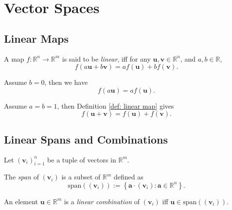 
\chapter{Vector Spaces}


\section{Linear Maps}



\begin{definition}
	\label{def: linear map}	
	A map $f: \mathbb R^n \to \mathbb R^m$ is said to be \textit{linear}, iff for any $\mathbf u, \mathbf v \in \mathbb R^n$, and $a, b \in \mathbb R$,
	$$
	f(a\mathbf u + b\mathbf v) = a f(\mathbf u) + b f(\mathbf v).
	$$
\end{definition}



\begin{note}
	Assume $b = 0$, then we have
	$$
	f(a\mathbf u) = a f(\mathbf u).
	$$

	Assume $a = b = 1$, then Definition \ref{def: linear map} gives
	$$
	f(\mathbf u + \mathbf v) = f(\mathbf u) + f(\mathbf v).
	$$	
\end{note}





\section{Linear Spans and Combinations}


\begin{definition}
	\label{def: span and combination}	
	Let $(\mathbf v_i)_{i = 1}^n$ be a tuple of vectors in $\mathbb R^m$.
	
	The \textit{span} of $(\mathbf v_i)$ is a subset of $\mathbb R^m$ defined as
	$$
	\mathrm{span}((\mathbf v_i)) := \left\{ \mathbf a \cdot (\mathbf v_i) : \mathbf a \in \mathbb R^n \right\}.
	$$
	
	An element $\mathbf u \in \mathbb R^m$ is a \textit{linear combination} of $(\mathbf v_i)$ iff $\mathbf u \in \mathrm{span}((\mathbf v_i))$.
\end{definition}



